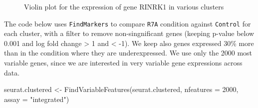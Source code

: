 \documentclass[
  letterpaper,
  DIV=11,
  numbers=noendperiod]{scrartcl}
\newenvironment{Shaded}{}{}
\newcommand{\AttributeTok}[1]{\textcolor[rgb]{0.49,0.56,0.16}{#1}}
\newcommand{\DecValTok}[1]{\textcolor[rgb]{0.25,0.63,0.44}{#1}}
\newcommand{\FunctionTok}[1]{\textcolor[rgb]{0.02,0.16,0.49}{#1}}
\newcommand{\NormalTok}[1]{#1}
\newcommand{\OtherTok}[1]{\textcolor[rgb]{0.00,0.44,0.13}{#1}}
\newcommand{\StringTok}[1]{\textcolor[rgb]{0.25,0.44,0.63}{#1}}
\begin{document}
\begin{figure}[H]


\caption{\label{fig-vln}Violin plot for the expression of gene RINRK1 in
various clusters}

\end{figure}%

The code below uses \texttt{FindMarkers} to compare \texttt{R7A}
condition against \texttt{Control} for each cluster, with a filter to
remove non-singnificant genes (keeping p-value below 0.001 and log fold
change \textgreater{} 1 and \textless{} -1). We keep also genes
expressed 30\% more than in the condition where they are underexpressed.
We use only the 2000 most variable genes, since we are interested in
very variable gene expressions across data.

\begin{Shaded}
\begin{Highlighting}[]
\NormalTok{seurat.clustered }\OtherTok{\textless{}{-}} \FunctionTok{FindVariableFeatures}\NormalTok{(seurat.clustered, }\AttributeTok{nfeatures =} \DecValTok{2000}\NormalTok{, }\AttributeTok{assay =} \StringTok{"integrated"}\NormalTok{)}
\end{Highlighting}
\end{Shaded}
\end{document}
